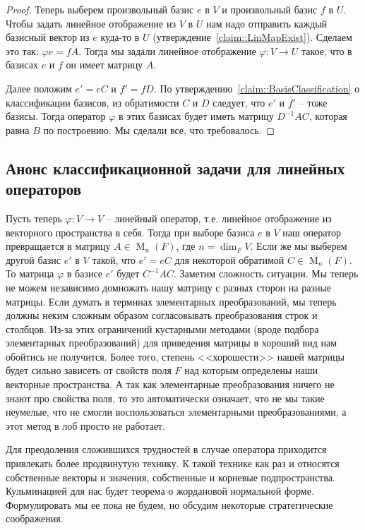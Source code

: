\begin{proof}
Теперь выберем произвольный базис $e$ в $V$ и произвольный базис $f$ в $U$.
Чтобы задать линейное отображение из $V$ в $U$ нам надо отправить каждый базисный вектор из $e$ куда-то в $U$ (утверждение~\ref{claim::LinMapExist}).
Сделаем это так: $\varphi e = f A$.
Тогда мы задали линейное отображение $\varphi \colon V\to U$ такое, что в базисах $e$ и $f$ он имеет матрицу $A$.

Далее положим $e' = eC$ и $f' = fD$.
По утверждению~\ref{claim::BasisClassification} о классификации базисов, из обратимости $C$ и $D$ следует, что $e'$ и $f'$ -- тоже базисы.
Тогда оператор $\varphi$ в этих базисах будет иметь матрицу $D^{-1}AC$, которая равна $B$ по построению.
Мы сделали все, что требовалось.
\end{proof}


\subsection{Анонс классификационной задачи для линейных операторов}

Пусть теперь $\varphi\colon V\to V$ -- линейный оператор, т.е. линейное отображение из векторного пространства в себя.
Тогда при выборе базиса $e$ в $V$ наш оператор превращается в матрицу $A\in \operatorname{M}_n(F)$, где $n = \dim_F V$.
Если же мы выберем другой базис $e'$ в $V$ такой, что $e' = eC$ для некоторой обратимой $C \in \operatorname{M}_n(F)$.
То матрица $\varphi$ в базисе $e'$ будет $C^{-1}AC$.
Заметим сложность ситуации.
Мы теперь не можем независимо домножать нашу матрицу с разных сторон на разные матрицы.
Если думать в терминах элементарных преобразований, мы теперь должны неким сложным образом согласовывать преобразования строк и столбцов.
Из-за этих ограничений кустарными методами (вроде подбора элементарных преобразований) для приведения матрицы в хороший вид нам обойтись не получится.
Более того, степень <<хорошести>> нашей матрицы будет сильно зависеть от свойств поля $F$ над которым определены наши векторные пространства.
А так как элементарные преобразования ничего не знают про свойства поля, то это автоматически означает, что не мы такие неумелые, что не смогли воспользоваться элементарными преобразованиями, а этот метод в лоб просто не работает.

Для преодоления сложившихся трудностей в случае оператора приходится привлекать более продвинутую технику.
К такой технике как раз и относятся собственные векторы и значения, собственные и корневые подпространства.
Кульминацией для нас будет теорема о жордановой нормальной форме.
Формулировать мы ее пока не будем, но обсудим некоторые стратегические соображения.

